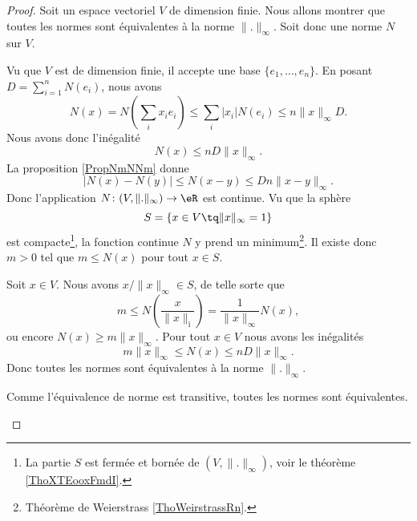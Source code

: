 \begin{proof}
	Soit un espace vectoriel \( V\) de dimension finie. Nous allons montrer que toutes les normes sont équivalentes à la norme \( \| . \|_{\infty}\). Soit donc une norme \( N\) sur \( V\).

	\begin{subproof}
		Vu que \( V\) est de dimension finie, il accepte une base \( \{ e_1,\ldots, e_n \}\). En posant \( D=\sum_{i=1}^nN(e_i)\), nous avons
		\begin{equation}
			N(x)=N(\sum_ix_ie_i)\leq \sum_i|x_i|N(e_i)\leq n\| x \|_{\infty}D.
		\end{equation}
		Nous avons donc l'inégalité
		\begin{equation}
			N(x)\leq nD\| x \|_{\infty}.
		\end{equation}
		La proposition \ref{PropNmNNm} donne
		\begin{equation}
			\big| N(x)-N(y) \big|\leq N(x-y)\leq Dn\| x-y \|_{\infty}.
		\end{equation}
		Donc l'application \( N\colon (V,\| . \|_{\infty})\to \eR \) est continue. Vu que la sphère
		\begin{equation}
			S=\{ x\in V\tq \| x \|_{\infty}=1 \}
		\end{equation}
		est compacte\footnote{La partie \( S\) est fermée et bornée de \( (V,\| . \|_{\infty})\), voir le théorème \ref{ThoXTEooxFmdI}.}, la fonction continue \( N\) y prend un minimum\footnote{Théorème de Weierstrass \ref{ThoWeirstrassRn}.}. Il existe donc \( m>0\) tel que \( m\leq N(x)\) pour tout \( x\in S\).

		Soit \( x\in V\). Nous avons \( x/\| x \|_{\infty}\in S\), de telle sorte que
		\begin{equation}
			m\leq N(\frac{ x }{ \| x \|_{î} })=\frac{1}{ \| x \|_{\infty} }N(x),
		\end{equation}
		ou encore \( N(x)\geq m\| x \|_{\infty}\).
		\spitem[Conclusion]
		Pour tout \( x\in V\) nous avons les inégalités
		\begin{equation}
			m\| x \|_{\infty}\leq N(x)\leq nD\| x \|_{\infty}.
		\end{equation}
		Donc toutes les normes sont équivalentes à la norme \( \| . \|_{\infty}\).

		Comme l'équivalence de norme est transitive, toutes les normes sont équivalentes.
	\end{subproof}
\end{proof}

